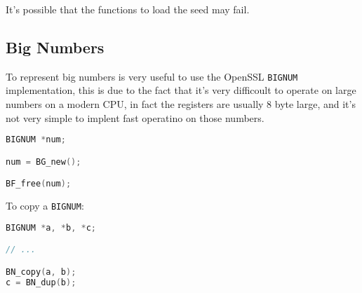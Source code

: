 \documentclass[12pt]{article}
\begin{document}
\hfill

It's possible that the functions to load the seed may fail.



\subsection{Big Numbers}
To represent big numbers is very useful to use the OpenSSL \texttt{BIGNUM} implementation, this is due to the fact that it's very difficoult to operate on large numbers on a modern CPU, in fact the registers are usually 8 byte large, and it's not very simple to implent fast operatino on those numbers.
\begin{lstlisting}[language=c]
BIGNUM *num;

num = BG_new();

BF_free(num);
\end{lstlisting}
To copy a \texttt{BIGNUM}:
\begin{lstlisting}[language=c]
BIGNUM *a, *b, *c;

// ...

BN_copy(a, b);
c = BN_dup(b);
\end{lstlisting}
\end{document}

